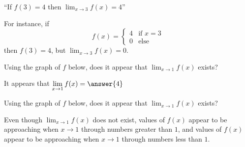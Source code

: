 \documentclass{ximera}
\begin{document}
\begin{question}
``If $f(3) = 4$ then $\displaystyle \lim_{x \to 3} f(x) = 4$''

\begin{multipleChoice}
\end{multipleChoice}

\begin{feedback}
  For instance, if
  \[
  f(x) =
  \begin{cases}
    4 &\text{if $x=3$} \\
    0 &\text{else}
  \end{cases}
  \]
  then $f(3)=4$, but $\lim_{x \to 3} f(x) =0$.
\end{feedback}
\end{question}

\begin{question}
Using the graph of $f$ below, does it appear that $\lim_{x \to 1} f(x)$ exists?  


\begin{multipleChoice}
\end{multipleChoice}


\begin{question}
	It appears that $\lim_{x\to 1} f(x) =  \answer{4}$ 
\end{question}


\end{question}



\begin{question}
Using the graph of $f$ below, does it appear that $\lim_{x \to 1} f(x)$ exists?  


\begin{multipleChoice}
\end{multipleChoice}


\begin{question}
  Even though $\lim_{x \to 1} f(x)$ does not exist, values of
  $f(x)$ appear to be approaching  when $x \to 1$
  through numbers greater than $1$, and values of $f(x)$ appear
  to be approaching  when $x \to 1$ through numbers
  less than $1$.
\end{question}

\end{question}
\end{document}
